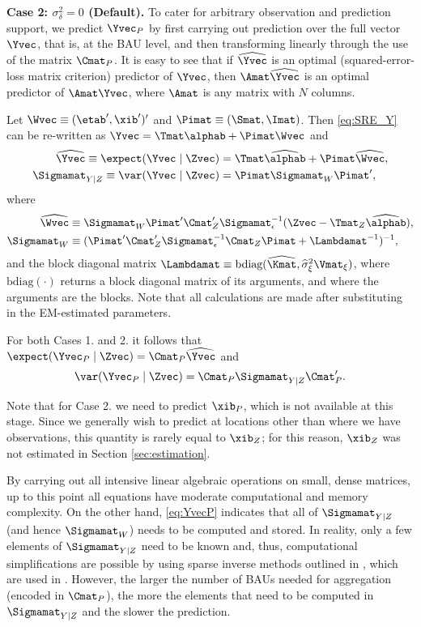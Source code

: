 {\bf Case 2: $\sigma^2_\delta = 0$ (Default).} To cater for arbitrary observation and prediction support, we predict $\Yvec_P$ by first carrying out prediction over the full vector $\Yvec$, that is, at the BAU level, and then transforming linearly through the use of the matrix $\Cmat_P$. It is easy to see that if $\widehat\Yvec$ is an optimal (squared-error-loss matrix criterion) predictor of $\Yvec$, then $\Amat\widehat\Yvec$ is an optimal predictor of $\Amat\Yvec$, where $\Amat$ is any matrix with $N$ columns.

Let $\Wvec \equiv (\etab',\xib')'$ and $\Pimat \equiv (\Smat,\Imat)$. Then \eqref{eq:SRE_Y} can be re-written as $\Yvec = \Tmat\alphab + \Pimat\Wvec$ and
\begin{align}
\widehat\Yvec \equiv \expect(\Yvec \mid \Zvec) &= \Tmat\widehat\alphab + \Pimat\widehat\Wvec, \\
\Sigmamat_{Y \mid Z} \equiv \var(\Yvec \mid \Zvec) &= \Pimat \Sigmamat_W\Pimat', \label{eq:Sigma_YZ}
\end{align}
where
\begin{align}
\widehat\Wvec &\equiv \Sigmamat_W\Pimat'\Cmat_Z'\Sigmamat_\epsilon^{-1}(\Zvec - \Tmat_Z\widehat\alphab),\label{eq:What} \\
\Sigmamat_W &\equiv (\Pimat' \Cmat_Z' \Sigmamat_\epsilon^{-1} \Cmat_Z \Pimat + \Lambdamat^{-1})^{-1}, \label{eq:Winv}
\end{align}
and the block diagonal matrix $\Lambdamat \equiv \textrm{bdiag}(\widehat\Kmat,\widehat\sigma^{2}_\xi\Vmat_{\xi})$, where $\textrm{bdiag}(\cdot)$ returns a block diagonal matrix of its arguments, and where the arguments are the blocks. Note that all calculations are made after substituting in the EM-estimated parameters.

For both Cases 1. and 2. it follows that $\expect(\Yvec_P \mid \Zvec) = \Cmat_P\widehat\Yvec$ and
\begin{equation}\label{eq:YvecP}
\var(\Yvec_P \mid \Zvec) = \Cmat_P \Sigmamat_{Y \mid Z} \Cmat_P'.
\end{equation}

Note that for Case 2. we need to predict $\xib_P$, which is not available at this stage. Since we generally wish to predict at locations other than where we have observations, this quantity is rarely equal to $\xib_Z$; for this reason, $\xib_Z$ was not estimated in Section \ref{sec:estimation}.

By carrying out all intensive linear algebraic operations on small, dense matrices, up to this point all equations have moderate computational and memory complexity. On the other hand, \eqref{eq:YvecP} indicates that all of $\Sigmamat_{Y \mid Z}$ (and hence $\Sigmamat_W$) needs to be computed and stored. In reality, only a few elements of $\Sigmamat_{Y \mid Z}$ need to be known and, thus, computational simplifications are possible by using sparse inverse methods outlined in \citet{Takahashi_1973}, which are used in . However, the larger the number of BAUs needed for aggregation (encoded in $\Cmat_P$), the more the elements that need to be computed  in $\Sigmamat_{Y \mid Z}$ and the slower the prediction.
